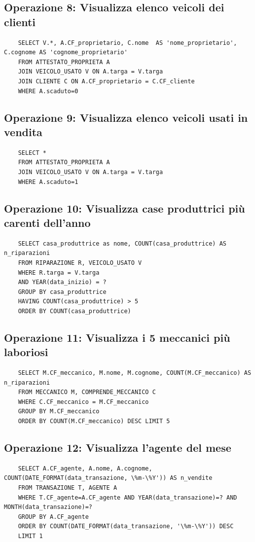 \documentclass[a4paper,12pt]{report}
\begin{document}
\subsection*{Operazione 8: Visualizza elenco veicoli dei clienti}
\begin{lstlisting}
	SELECT V.*, A.CF_proprietario, C.nome  AS 'nome_proprietario', C.cognome AS 'cognome_proprietario'
    FROM ATTESTATO_PROPRIETA A
    JOIN VEICOLO_USATO V ON A.targa = V.targa
    JOIN CLIENTE C ON A.CF_proprietario = C.CF_cliente
    WHERE A.scaduto=0
\end{lstlisting}

\subsection*{Operazione 9: Visualizza elenco veicoli usati in vendita}
\begin{lstlisting}
	SELECT *  
	FROM ATTESTATO_PROPRIETA A
	JOIN VEICOLO_USATO V ON A.targa = V.targa 
	WHERE A.scaduto=1
\end{lstlisting}

\subsection*{Operazione 10: Visualizza case produttrici più carenti dell'anno}
\begin{lstlisting}
	SELECT casa_produttrice as nome, COUNT(casa_produttrice) AS n_riparazioni
	FROM RIPARAZIONE R, VEICOLO_USATO V
    WHERE R.targa = V.targa
    AND YEAR(data_inizio) = ?
    GROUP BY casa_produttrice
    HAVING COUNT(casa_produttrice) > 5
    ORDER BY COUNT(casa_produttrice)
\end{lstlisting}

\subsection*{Operazione 11: Visualizza i 5 meccanici più laboriosi}
\begin{lstlisting}
	SELECT M.CF_meccanico, M.nome, M.cognome, COUNT(M.CF_meccanico) AS n_riparazioni
	FROM MECCANICO M, COMPRENDE_MECCANICO C
    WHERE C.CF_meccanico = M.CF_meccanico
    GROUP BY M.CF_meccanico
    ORDER BY COUNT(M.CF_meccanico) DESC LIMIT 5
\end{lstlisting}

\subsection*{Operazione 12: Visualizza l'agente del mese}
\begin{lstlisting}
	SELECT A.CF_agente, A.nome, A.cognome, COUNT(DATE_FORMAT(data_transazione, \%m-\%Y')) AS n_vendite
    FROM TRANSAZIONE T, AGENTE A
    WHERE T.CF_agente=A.CF_agente AND YEAR(data_transazione)=? AND MONTH(data_transazione)=?
    GROUP BY A.CF_agente
    ORDER BY COUNT(DATE_FORMAT(data_transazione, '\%m-\%Y')) DESC
    LIMIT 1
\end{lstlisting}
\end{document}
